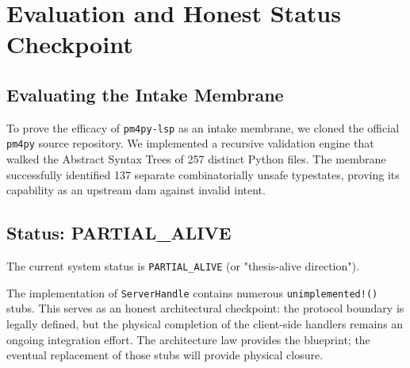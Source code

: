 
\chapter{Evaluation and Honest Status Checkpoint}
\section{Evaluating the Intake Membrane}
To prove the efficacy of \texttt{pm4py-lsp} as an intake membrane, we cloned the official \texttt{pm4py} source repository. We implemented a recursive validation engine that walked the Abstract Syntax Trees of 257 distinct Python files. The membrane successfully identified 137 separate combinatorially unsafe typestates, proving its capability as an upstream dam against invalid intent.

\section{Status: PARTIAL\_ALIVE}
The current system status is \texttt{PARTIAL\_ALIVE} (or "thesis-alive direction"). 

The implementation of \texttt{ServerHandle} contains numerous \texttt{unimplemented!()} stubs. This serves as an honest architectural checkpoint: the protocol boundary is legally defined, but the physical completion of the client-side handlers remains an ongoing integration effort. The architecture law provides the blueprint; the eventual replacement of those stubs will provide physical closure.
